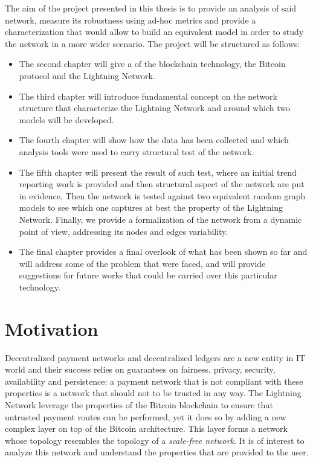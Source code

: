 		The aim of the project presented in this thesis is to provide an analysis of said network, measure its robustness using ad-hoc metrics and provide a characterization that would allow to build an equivalent model in order to study the network in a more wider scenario. The project will be structured as follows:
		\begin{itemize}
			\item The second chapter will give a  of the blockchain technology, the Bitcoin protocol and the Lightning Network.
			\item The third chapter will introduce fundamental concept on the network structure that characterize the Lightning Network and around which two models will be developed.
			\item The fourth chapter will show how the data has been collected and which analysis tools were used to carry structural test of the network.
			\item The fifth chapter will present the result of such test, where an initial trend reporting work is provided and then structural aspect of the network are put in evidence. Then the network is tested against two equivalent random graph models to see which one captures at best the property of the Lightning Network. Finally, we provide a formalization of the network from a dynamic point of view, addressing its nodes and edges variability.
			\item The final chapter provides a final overlook of what has been shown so far and will address some of the problem that were faced, and will provide suggestions for future works that could be carried over this particular technology.
		\end{itemize}
	\section{Motivation}
		Decentralized payment networks and decentralized ledgers are a new entity in IT world and their success relies on guarantees on fairness, privacy, security, availability and persistence: a payment network that is not compliant with these properties is a network that should not to be trusted in any way. The Lightning Network leverage the properties of the Bitcoin blockchain to ensure that untrusted payment routes can be performed, yet it does so by adding a new complex layer on top of the Bitcoin architecture. This layer forms a network whose topology resembles the topology of a \textit{scale-free network}. It is of interest to analyze this network and understand the properties that are provided to the user. 
		
